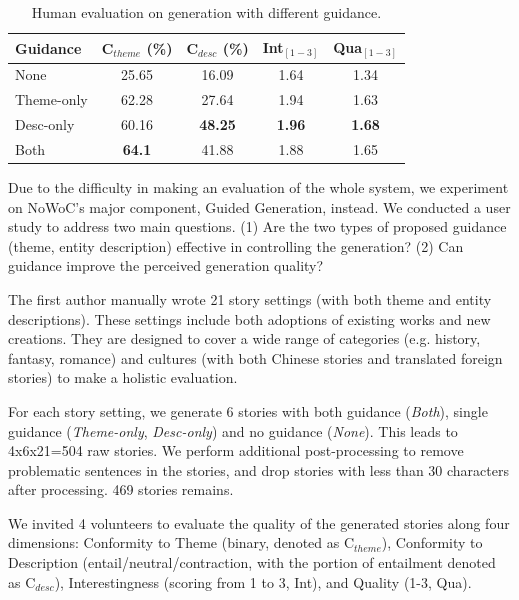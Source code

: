 \documentclass{article}
\begin{document}
\begin{table}[t]
    \centering
    \small
    \begin{tabular}{lcccc}
    \hline
    Guidance   & C$_{theme}$ (\%) & C$_{desc}$ (\%) & Int$_{[1-3]}$ & Qua$_{[1-3]}$  \\
    \hline
    None       & 25.65             & 16.09            & 1.64                 & 1.34          \\
    Theme-only & 62.28             & 27.64            & 1.94                 & 1.63          \\
    Desc-only  & 60.16             & \textbf{48.25}   & \textbf{1.96}        & \textbf{1.68} \\
    Both       & \textbf{64.1}     & 41.88            & 1.88                 & 1.65         \\
    \hline
    \end{tabular}
    \caption{Human evaluation on generation with different guidance.}
    \label{tab:eval}
\end{table}

Due to the difficulty in making an evaluation of the whole system, we experiment on NoWoC's major component, Guided Generation, instead. We conducted a user study to address two main questions. (1) Are the two types of proposed guidance (theme, entity description) effective in controlling the generation? (2) Can guidance improve the perceived generation quality?

The first author manually wrote 21 story settings (with both theme and entity descriptions). These settings include both adoptions of existing works and new creations. They are designed to cover a wide range of categories (e.g. history, fantasy, romance) and cultures (with both Chinese stories and translated foreign stories) to make a holistic evaluation. 

For each story setting, we generate 6 stories with both guidance (\textit{Both}), single guidance (\textit{Theme-only}, \textit{Desc-only}) and no guidance (\textit{None}). This leads to 4x6x21=504 raw stories. We perform additional post-processing to remove problematic sentences in the stories, and drop stories with less than 30 characters after processing. 469 stories remains.

We invited 4 volunteers to evaluate the quality of the generated stories 
along four dimensions: Conformity to Theme (binary, denoted as C$_{theme}$), 
Conformity to Description (entail/neutral/contraction, with the portion of entailment denoted as C$_{desc}$), Interestingness (scoring from 1 to 3, Int), and 
Quality (1-3, Qua).
\end{document}
